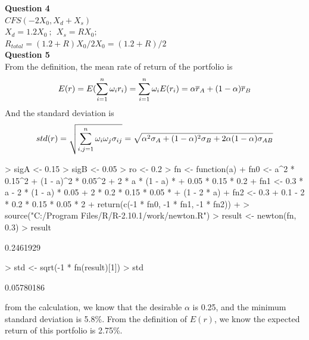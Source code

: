 \documentclass[a4paper,12pt]{article}
\begin{document}
\noindent\textbf{Question 4}\\
\noindent$CFS(-2X_0, X_d + X_s)$ \\
\noindent$X_d = 1.2X_0\ ;\ \ X_s = RX_0;$\\
\noindent$R_{total} = (1.2 + R)X_0/2X_0 = (1.2 + R)/2$\\


\noindent\textbf{Question 5}\\

\noindent From the definition, the mean rate of return of the portfolio is
\begin{equation}
\centering
E(r) = E(\sum\limits_{i=1}^{n}\omega_ir_i) = \sum\limits_{i=1}^{n}\omega_iE(r_i) = \alpha\overline{r}_A + (1-\alpha)\overline{r}_B
\end{equation}
And the standard deviation is
\begin{equation}
\centering
std(r) = \sqrt{\sum\limits_{i,j=1}^{n}\omega_i\omega_j\sigma_{ij}} = \sqrt{\alpha^2\sigma_A + (1-\alpha)^2\sigma_B +
2\alpha(1-\alpha)\sigma_{AB}}
\end{equation}
\begin{Schunk}
\begin{Sinput}
> sigA <- 0.15
> sigB <- 0.05
> ro <- 0.2
> fn <- function(a) {
+     fn0 <- a^2 * 0.15^2 + (1 - a)^2 * 0.05^2 + 2 * a * (1 - a) *
+         0.05 * 0.15 * 0.2
+     fn1 <- 0.3 * a - 2 * (1 - a) * 0.05 + 2 * 0.2 * 0.15 * 0.05 *
+         (1 - 2 * a)
+     fn2 <- 0.3 + 0.1 - 2 * 0.2 * 0.15 * 0.05 * 2
+     return(c(-1 * fn0, -1 * fn1, -1 * fn2))
+ }
> source("C:/Program Files/R/R-2.10.1/work/newton.R")
> result <- newton(fn, 0.3)
> result
\end{Sinput}
\begin{Soutput}
[1] 0.2461929
\end{Soutput}
\begin{Sinput}
> std <- sqrt(-1 * fn(result)[1])
> std
\end{Sinput}
\begin{Soutput}
[1] 0.05780186
\end{Soutput}
\end{Schunk}
from the calculation, we know that the desirable $\alpha$ is 0.25, and the minimum standard deviation is 5.8\%. From the definition of $E(r)$, we know the expected return of this portfolio is 2.75\%.
\end{document}
